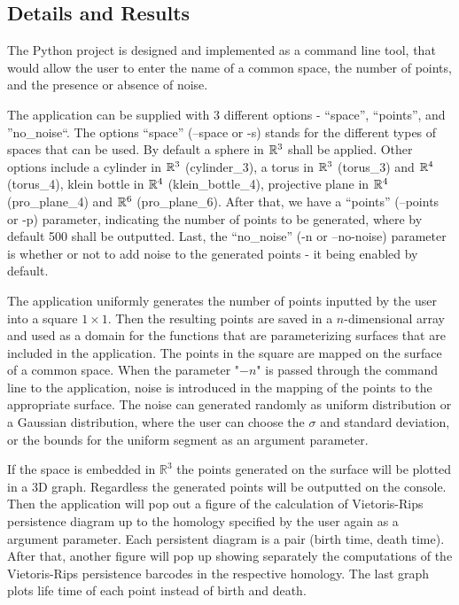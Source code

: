 \documentclass[11pt,a4paper]{report}
\begin{document}
            \subsection{Details and Results}

            The Python project is designed and implemented as a command line tool, that would allow the user to enter the name
            of a common space, the number of points, and the presence or absence of noise.

            The application can be supplied with 3 different options - ``space'', ``points'', and ''no\_noise``. The options ``space'' (--space or -s) stands for the different types of spaces that can be used. By default a sphere in $\mathbb{R}^3$  shall be applied. Other options include a cylinder in $\mathbb{R}^3$ (cylinder\_3), a torus in $\mathbb{R}^3$ (torus\_3) and $\mathbb{R}^4$ (torus\_4), klein bottle in $\mathbb{R}^4$ (klein\_bottle\_4), projective plane in $\mathbb{R}^4$ (pro\_plane\_4) and $\mathbb{R}^6$ (pro\_plane\_6). After that, we have a ``points'' (--points or -p) parameter, indicating the number of points to be generated, where by default 500 shall be outputted. Last, the ``no\_noise'' (-n or --no-noise) parameter is whether or not to add noise to the generated points - it being enabled by default.

            The application uniformly generates the number of points inputted by the user into a square $1 \times 1$. Then the resulting points are saved in a $n$-dimensional array and used as a domain for the functions that are parameterizing surfaces that are included in the application. The points in the square are mapped on the surface of a common space. When the parameter "$-n$" is passed through the command line to the application, noise is introduced in the mapping of the points to the appropriate surface. The noise can generated randomly as uniform distribution or a Gaussian distribution, where the user can choose the $\sigma$ and standard deviation, or the bounds for the uniform segment as an argument parameter.

            If the space is embedded in $\mathbb{R}^3$ the points generated on the surface will be plotted in a 3D graph. Regardless the generated points will be outputted on the console. Then the application will pop out a figure of the calculation of Vietoris-Rips persistence diagram up to the homology specified by the user again as a argument parameter. Each persistent diagram is a pair (birth time, death time).  
            After that, another figure will pop up showing separately the computations of the Vietoris-Rips persistence barcodes in the respective homology. The last graph plots life time of each point instead of birth and death.
\end{document}
